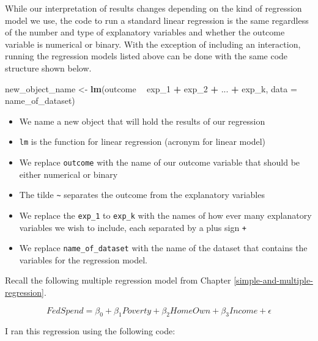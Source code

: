 \documentclass[
]{book}
\newenvironment{Shaded}{\begin{snugshade}}{\end{snugshade}}
\newcommand{\DataTypeTok}[1]{\textcolor[rgb]{0.13,0.29,0.53}{#1}}
\newcommand{\DecValTok}[1]{\textcolor[rgb]{0.00,0.00,0.81}{#1}}
\newcommand{\KeywordTok}[1]{\textcolor[rgb]{0.13,0.29,0.53}{\textbf{#1}}}
\newcommand{\NormalTok}[1]{#1}
\newcommand{\OperatorTok}[1]{\textcolor[rgb]{0.81,0.36,0.00}{\textbf{#1}}}
\newcommand{\StringTok}[1]{\textcolor[rgb]{0.31,0.60,0.02}{#1}}
\providecommand{\tightlist}{%
  \setlength{\itemsep}{0pt}\setlength{\parskip}{0pt}}
\begin{document}
While our interpretation of results changes depending on the kind of regression model we use, the code to run a standard linear regression is the same regardless of the number and type of explanatory variables and whether the outcome variable is numerical or binary. With the exception of including an interaction, running the regression models listed above can be done with the same code structure shown below.

\begin{Shaded}
\begin{Highlighting}[]
\NormalTok{new_object_name <-}\StringTok{ }\KeywordTok{lm}\NormalTok{(outcome }\OperatorTok{~}\StringTok{ }\NormalTok{exp_}\DecValTok{1} \OperatorTok{+}\StringTok{ }\NormalTok{exp_}\DecValTok{2} \OperatorTok{+}\StringTok{ }\NormalTok{... }\OperatorTok{+}\StringTok{ }\NormalTok{exp_k, }\DataTypeTok{data =}\NormalTok{ name_of_dataset)}
\end{Highlighting}
\end{Shaded}

\begin{itemize}
\tightlist
\item
  We name a new object that will hold the results of our regression
\item
  \texttt{lm} is the function for linear regression (acronym for linear model)
\item
  We replace \texttt{outcome} with the name of our outcome variable that should be either numerical or binary
\item
  The tilde \texttt{\textasciitilde{}} separates the outcome from the explanatory variables
\item
  We replace the \texttt{exp\_1} to \texttt{exp\_k} with the names of how ever many explanatory variables we wish to include, each separated by a plus sign \texttt{+}
\item
  We replace \texttt{name\_of\_dataset} with the name of the dataset that contains the variables for the regression model.
\end{itemize}

Recall the following multiple regression model from Chapter \ref{simple-and-multiple-regression}.

\begin{equation}
FedSpend = \beta_0 + \beta_1Poverty + \beta_2HomeOwn + \beta_3Income + \epsilon
\label{eq:multregexrep}
\end{equation}

I ran this regression using the following code:
\end{document}

